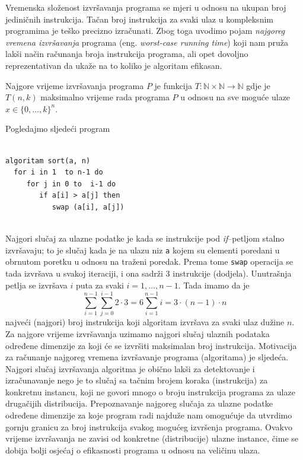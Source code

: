 Vremenska složenost izvršavanja programa se mjeri u odnosu na ukupan broj
jediničnih instrukcija. Tačan broj instrukcija za svaki ulaz u kompleksnim programima je     teško precizno izračunati. Zbog toga uvodimo pojam \textit{najgoreg vremena izvršavanja} programa (eng. \textit{worst-case running time}) koji nam pruža   lakši način računanja broja instrukcija programa, ali opet dovoljno reprezentativan da ukaže na to koliko je algoritam efikasan. 

\begin{definition}
	  Najgore vrijeme izvršavanja programa $P$ je funkcija $T \colon \mathbb{N} \times \mathbb{N} \rightarrow \mathbb{N}$ gdje je $T (n, k)$ maksimalno
	vrijeme rada programa $P$ u odnosu na sve moguće ulaze $x \in  \{0, \ldots , k\}^n$.
\end{definition}

\begin{example} 
	
	Pogledajmo sljedeći program  \\  \vspace{0.3cm} 
\begin{verbatim}

algoritam sort(a, n)
  for i in 1  to n-1 do
     for j in 0 to  i-1 do
        if a[i] > a[j] then
           swap (a[i], a[j])
           
           	\end{verbatim}
\end{example}

Najgori slučaj za ulazne podatke je kada se instrukcije pod \emph{if}--petljom stalno izvršavaju; to je slučaj kada je na ulazu niz \texttt{a} kojem su elementi poredani u obrnutom  poretku u odnosu na traženi poredak. Prema tome \texttt{swap} operacija se tada izvršava u svakoj iteraciji, i ona sadrži 3 instrukcije (dodjela). Unutrašnja petlja se izvršava $i$ puta  za svaki $i=1, \ldots, n-1$.  Tada imamo da je  
$$ \sum_{i=1}^{n-1} \sum_{j=0}^{i-1} 2 \cdot 3 = 6 \sum_{i=1}^{n-1} i = 3 \cdot {(n-1) \cdot n}$$ najveći (najgori) broj instrukcija koji algoritam izvršava za svaki ulaz dužine $n$. 
\\


Za najgore vrijeme izvršavanja  uzimamo najgori slučaj ulaznih podataka određene dimenzije za koji će se izvršiti maksimalan broj instrukcija. Motivacija za računanje najgoreg vremena izvršavanje programa (algoritama) je sljedeća. Najgori slučaj izvršavanja algoritma je obično lakši za detektovanje i izračunavanje nego je to slučaj sa   tačnim brojem koraka (instrukcija) za konkretnu instancu, koji ne govori mnogo o broju instrukcija programa za ulaze drugačijih distribucija. Prepoznavanje najgoreg slučaja za ulazne podatke određene dimenzije za koje program radi najduže nam omogućuje da utvrdimo gornju granicu za broj instrukcija svakog mogućeg izvršenja programa. Ovakvo vrijeme izvršavanja ne  zavisi od konkretne (distribucije) ulazne instance, čime se dobija bolji osjećaj o efikasnosti programa u odnosu na veličinu ulaza.
 
